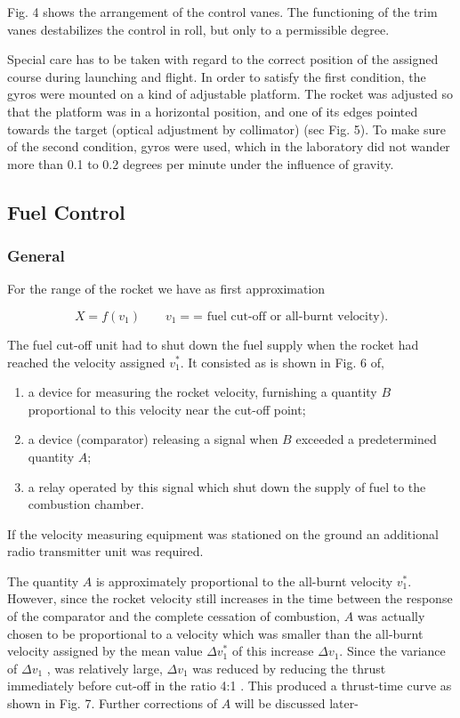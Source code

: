 \documentclass[12pt, a4paper]{article}
\begin{document}
Fig. 4 shows the arrangement of the control vanes. The functioning of the trim vanes destabilizes the control in roll, but only to a permissible degree.

Special care has to be taken with regard to the correct position of the assigned course during launching and flight. In order to satisfy the first condition, the gyros were mounted on a kind of adjustable platform. The rocket was adjusted so that the platform was in a horizontal position, and one of its edges pointed towards the target (optical adjustment by collimator) (sec Fig. 5). To make sure of the second condition, gyros were used, which in the laboratory did not wander more than 0.1 to 0.2 degrees per minute under the influence of gravity.

\subsection{Fuel Control}

\subsubsection{General}

For the range of the rocket we have as first approximation

\begin{equation}
  X=f(v_{1})\quad\quad v_{1}=\text{= fuel cut-off or all-burnt velocity).}
\end{equation}

The fuel cut-off unit had to shut down the fuel supply when the rocket had
reached the velocity assigned $v_{1}^{*}$. It consisted as is shown in Fig. 6 of,

\begin{enumerate}
  \item a device for measuring the rocket velocity, furnishing a quantity $B$ proportional to this velocity near the cut-off point;
  \item a device (comparator) releasing a signal when $B$ exceeded a predetermined
quantity $A$;
  \item a relay operated by this signal which shut down the supply of fuel to the
combustion chamber.
\end{enumerate}

If the velocity measuring equipment was stationed on the ground an additional radio transmitter unit was required.

The quantity $A$ is approximately proportional to the all-burnt velocity $v_{1}^{*}$. However, since the rocket velocity still increases in the time between the response of the comparator and the complete cessation of combustion, $A$ was actually chosen to be proportional to a velocity which was smaller than the all-burnt velocity assigned by the mean value $\Delta v_{1}^{*}$ of this increase $\Delta v_{1} $. Since the variance of $\Delta v_{1}$ , was relatively large, $\Delta v_{1}$  was reduced by reducing the thrust immediately before cut-off in the ratio 4:1 . This produced a thrust-time curve as shown in Fig. 7. Further corrections of $A$ will be discussed later-
\end{document}
